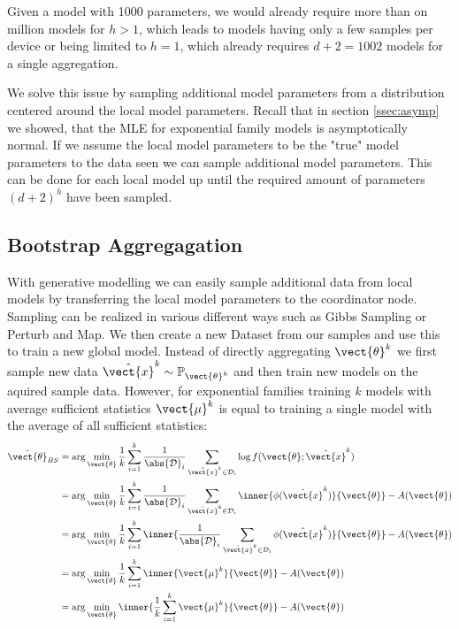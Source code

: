 Given a model with 1000 parameters, we would already require more than on million models for $h > 1$, which leads to models having only a few samples per device or being limited to $h=1$, which already requires $d+2 = 1002$ models for a single aggregation.

We solve this issue by sampling additional model parameters from a distribution centered around the local model parameters. 
Recall that in section \ref{ssec:asymp} we showed, that the MLE for exponential family 
models is asymptotically normal.
If we assume the local model parameters to be the "true" model parameters \wrt to the data seen we can sample additional model parameters. 
This can be done for each local model up until the required amount of parameters $(d+2)^h$ have been sampled.


\subsection{Bootstrap Aggregagation}

With generative modelling we can easily sample additional data from local models by transferring the local model parameters to the coordinator node.
Sampling can be realized in various different ways such as Gibbs Sampling or Perturb and Map.
We then create a new Dataset from our samples and use this to train a new global model. 
Instead of directly aggregating $\vect{\theta}^k$ we first sample new data  $\hat{\vect{x}}^k \sim \mathbb{P}_{\vect{\theta}^k}$ and then train new models on the aquired sample data.
However, for exponential families training $k$ models with average sufficient statistics $\vect{\mu}^k$ is equal to training a single model with the average of all sufficient statistics:
\begin{equation}
    \begin{split}
        \bar{\vect{\theta}}_{BS} &= \arg\min_{\vect{\theta}} \frac{1}{k}\sum_{i=1}^k \frac{1}{\abs{\mathcal{D}}_i} \sum_{\hat{\vect{x}}^k \in \mathcal{D}_i} \log f(\vect{\theta}; \hat{\vect{x}}^k) \\
        &=  \arg\min_{\vect{\theta}} \frac{1}{k}\sum_{i=1}^k \frac{1}{\abs{\mathcal{D}}_i} \sum_{\hat{\vect{x}}^k \in \mathcal{D}_i} \inner{\phi(\hat{\vect{x}}^k)}{\vect{\theta}} - A(\vect{\theta}) \\
        &= \arg\min_{\vect{\theta}} \frac{1}{k}\sum_{i=1}^k \inner{\frac{1}{\abs{\mathcal{D}}_i} \sum_{\hat{\vect{x}}^k \in \mathcal{D}_i} \phi(\hat{\vect{x}}^k)}{\vect{\theta}} - A(\vect{\theta}) \\
        &= \arg\min_{\vect{\theta}} \frac{1}{k}\sum_{i=1}^k \inner{\vect{\mu}^k}{\vect{\theta}} - A(\vect{\theta}) \\
        & =  \arg\min_{\vect{\theta}} \inner{\frac{1}{k}\sum_{i=1}^k  \vect{\mu}^k}{\vect{\theta}} - A(\vect{\theta})
    \end{split}
\end{equation}

